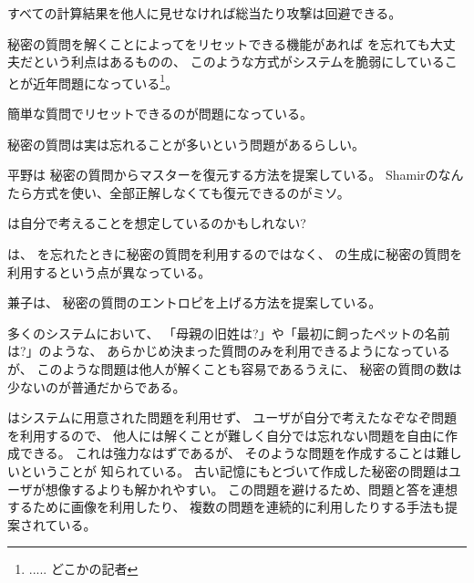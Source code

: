 \documentclass[twoside]{wiss}
\begin{document}
すべての計算結果を他人に見せなければ総当たり攻撃は回避できる。

秘密の質問を解くことによって{\PW}をリセットできる機能があれば
{\PW}を忘れても大丈夫だという利点はあるものの、
このような方式がシステムを脆弱にしていることが近年問題になっている\footnote{
  ..... どこかの記者
}。

簡単な質問でリセットできるのが問題になっている。

秘密の質問は実は忘れることが多いという問題があるらしい。

平野\cite{平野亮:2011-11-07}は
秘密の質問からマスター{\PW}を復元する方法を提案している。
Shamirのなんたら方式を使い、全部正解しなくても復元できるのがミソ。

{\PW}は自分で考えることを想定しているのかもしれない?


{\EP}は、
{\PW}を忘れたときに秘密の質問を利用するのではなく、
{\PW}の生成に秘密の質問を利用するという点が異なっている。

兼子は、
秘密の質問のエントロピを上げる方法を提案している\cite{Kaneko}。

多くのシステムにおいて、
「母親の旧姓は?」や「最初に飼ったペットの名前は?」のような、
あらかじめ決まった質問のみを利用できるようになっているが、
このような問題は他人が解くことも容易であるうえに、
秘密の質問の数は少ないのが普通だからである\cite{Rabkin:2008:PKQ:1408664.1408667}。

{\EP}はシステムに用意された問題を利用せず、
ユーザが自分で考えたなぞなぞ問題を利用するので、
他人には解くことが難しく自分では忘れない問題を自由に作成できる。
これは強力なはずであるが、
そのような問題を作成することは難しいということが
知られている\cite{Just:2009:PCC:1572532.1572543}\cite{Schechter:2009:NSM:1607723.1608145}。
%
%
%
古い記憶にもとづいて作成した秘密の問題はユーザが想像するよりも解かれやすい。
この問題を避けるため、問題と答を連想するために画像を利用したり、
複数の問題を連続的に利用したりする手法も提案されている\cite{Renaud:2010:PQE:2146303.2146318}。
\end{document}
